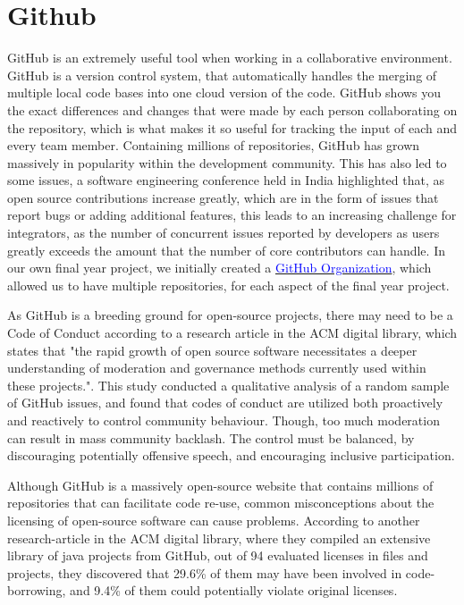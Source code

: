 \section{Github}

GitHub is an extremely useful tool when working in a collaborative environment. GitHub is a version control system, that automatically handles the merging of multiple local code bases into one cloud version of the code. GitHub shows you the exact differences and changes that were made by each person collaborating on the repository, which is what makes it so useful for tracking the input of each and every team member. Containing millions of repositories, GitHub has grown massively in popularity within the development community. This has also led to some issues, a software engineering conference held in India highlighted that, as open source contributions increase greatly, which are in the form of issues that report bugs or adding additional features, this leads to an increasing challenge for integrators, as the number of concurrent issues reported by developers as users greatly exceeds the amount that the number of core contributors can handle\cite{github_issues}. In our own final year project, we initially created a \href{https://docs.github.com/en/organizations/collaborating-with-groups-in-organizations/about-organizations}{\textcolor{blue}{GitHub Organization}}, which allowed us to have multiple repositories, for each aspect of the final year project.

As GitHub is a breeding ground for open-source projects, there may need to be a Code of Conduct according to a research article in the ACM digital library, which states that "the rapid growth of open source software necessitates a deeper understanding of moderation and governance methods currently used within these projects."\cite{code_of_conduct}. This study conducted a qualitative analysis of a random sample of GitHub issues, and found that codes of conduct are utilized both proactively and reactively to control community behaviour. Though, too much moderation can result in mass community backlash. The control must be balanced, by discouraging potentially offensive speech, and encouraging inclusive participation.

Although GitHub is a massively open-source website that contains millions of repositories that can facilitate code re-use, common misconceptions about the licensing of open-source software can cause problems. According to another research-article in the ACM digital library, where they compiled an extensive library of java projects from GitHub, out of 94 evaluated licenses in files and projects, they discovered that 29.6\% of them may have been involved in code-borrowing, and 9.4\% of them could potentially violate original licenses\cite{code_borrowing}.

